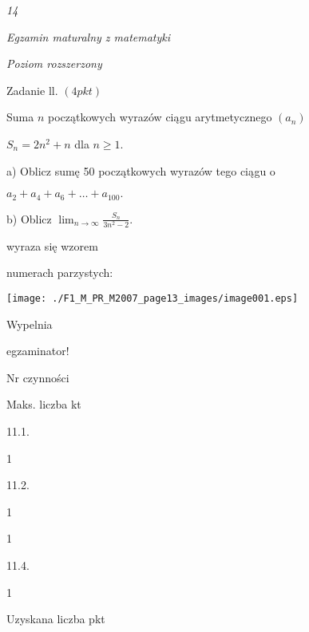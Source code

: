 \documentclass[a4paper,12pt]{article}
\begin{document}
{\it 14}

{\it Egzamin maturalny z matematyki}

{\it Poziom rozszerzony}

Zadanie ll. $(4pkt)$

Suma $n$ początkowych wyrazów ciągu arytmetycznego $(a_{n})$

$S_{n}=2n^{2}+n$ dla $n\geq 1.$

a) Oblicz sumę 50 początkowych wyrazów tego ciągu o

$a_{2}+a_{4}+a_{6}+\ldots+a_{100}.$

b) Oblicz $\displaystyle \lim_{n\rightarrow\infty}\frac{S_{n}}{3n^{2}-2}.$

wyraza się wzorem

numerach parzystych:
\begin{center}
\texttt{[image: ./F1\_M\_PR\_M2007\_page13\_images/image001.eps]}
\end{center}
Wypelnia

egzaminator!

Nr czynności

Maks. liczba kt

11.1.

1

11.2.

1

1

11.4.

1

Uzyskana liczba pkt
\end{document}
